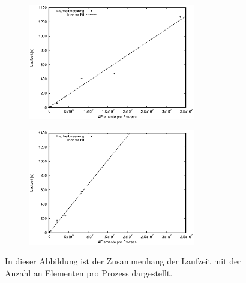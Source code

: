 \begin{figure}[t]%
  \centering
  \begin{subfigure}{\textwidth}
    \includegraphics[width=0.8\textwidth]{img/grav1_lin.eps}
  \end{subfigure}
  \begin{subfigure}{\textwidth}
    \includegraphics[width=0.8\textwidth]{img/grav_32_lin.eps}
  \end{subfigure}
  \caption{In dieser Abbildung ist der Zusammenhang der Laufzeit mit der Anzahl an Elementen pro Prozess dargestellt.}
  \label{fig:1-32x}
\end{figure}